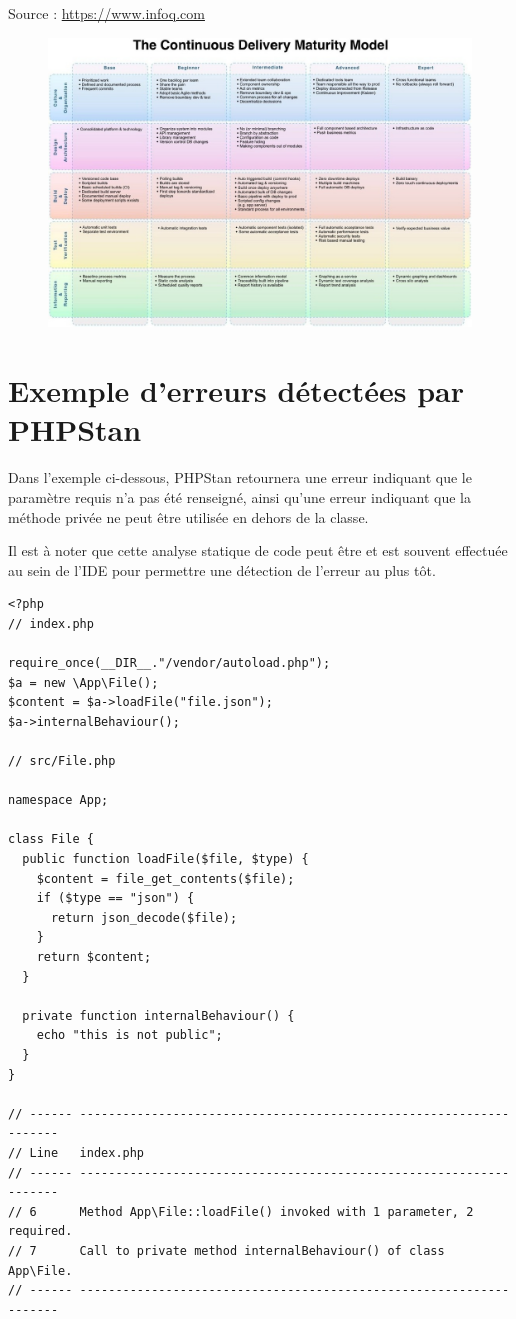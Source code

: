\normalsize{Source : \url{https://www.infoq.com}}

\begin{figure}[ht]
	\centering
	\includegraphics[scale=0.62,angle=-90]{img/devops-matrice.jpg}
	\label{annexe:devops-matrice}
\end{figure}

\clearpage
\section{Exemple d'erreurs détectées par PHPStan}

Dans l'exemple ci-dessous, PHPStan retournera une erreur indiquant que le paramètre requis  n'a pas été renseigné, ainsi qu'une erreur indiquant que la méthode privée  ne peut être utilisée en dehors de la classe. 

Il est à noter que cette analyse statique de code peut être et est souvent effectuée au sein de l'\gls{IDE} pour permettre une détection de l'erreur au plus tôt.

\begin{verbatim}
<?php
// index.php

require_once(__DIR__."/vendor/autoload.php");
$a = new \App\File();
$content = $a->loadFile("file.json");
$a->internalBehaviour();

// src/File.php

namespace App;

class File {
  public function loadFile($file, $type) {
    $content = file_get_contents($file);
    if ($type == "json") {
      return json_decode($file);
    }
    return $content;
  }
  
  private function internalBehaviour() {
    echo "this is not public";
  }
}

// ------ ------------------------------------------------------------------- 
// Line   index.php                                                          
// ------ ------------------------------------------------------------------- 
// 6      Method App\File::loadFile() invoked with 1 parameter, 2 required.  
// 7      Call to private method internalBehaviour() of class App\File.      
// ------ ------------------------------------------------------------------- 

\end{verbatim}
\label{annexe:php-error}



